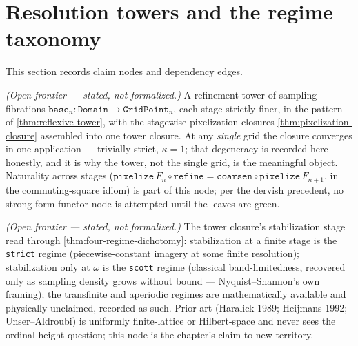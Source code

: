 \section{Resolution towers and the regime taxonomy}

This section records claim nodes and dependency edges.

\begin{proposition}\label{thm:resolution-tower}\notready{}
\emph{(Open frontier --- stated, not formalized.)} A refinement tower of sampling
fibrations $\texttt{base}_{n} : \texttt{Domain} \to \texttt{GridPoint}_{n}$, each stage
strictly finer, in the pattern of \cref{thm:reflexive-tower}, with the stagewise
pixelization closures \cref{thm:pixelization-closure} assembled into one tower closure.
At any \emph{single} grid the closure converges in one application --- trivially strict,
$\kappa = 1$; that degeneracy is recorded here honestly, and it is why the tower, not
the single grid, is the meaningful object. Naturality across stages
($\texttt{pixelize}\,F_{n} \circ \texttt{refine} = \texttt{coarsen} \circ
\texttt{pixelize}\,F_{n+1}$, in the commuting-square idiom) is part of this node; per
the dervish precedent, no strong-form functor node is attempted until the leaves are
green.
\end{proposition}

\begin{theorem}\label{thm:bandlimited-regime}\notready{}
\emph{(Open frontier --- stated, not formalized.)} The tower closure's stabilization
stage read through \cref{thm:four-regime-dichotomy}: stabilization at a finite stage is
the \texttt{strict} regime (piecewise-constant imagery at some finite resolution);
stabilization only at $\omega$ is the \texttt{scott} regime (classical band-limitedness,
recovered only as sampling density grows without bound --- Nyquist--Shannon's own
framing); the transfinite and aperiodic regimes are mathematically available and
physically unclaimed, recorded as such. Prior art (Haralick 1989; Heijmans 1992; Unser--Aldroubi)
is uniformly finite-lattice or Hilbert-space and never sees the ordinal-height question;
this node is the chapter's claim to new territory.
\end{theorem}
